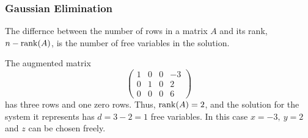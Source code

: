 \begin{frame}
	\frametitle{Gaussian Elimination}
	The differnce between the number of rows in a matrix $A$ and its rank, $n-\operatorname{rank}(A)$, is the number of free variables in the solution.
	\begin{presentation_example}
		The augmented matrix
		\begin{equation*}
			\left(\begin{array}{ccc|c}
				1 & 0 & 0 & -3\\
				0 & 1 & 0 & 2\\
				0 & 0 & 0 & 6
			\end{array}\right)
		\end{equation*}
		has three rows and one zero rows. Thus, $\operatorname{rank}(A)=2$, and the solution for the system it represents has $d=3-2=1$ free variables. In this case $x=-3,\ y=2$ and $z$ can be chosen freely.
	\end{presentation_example}
\end{frame}
